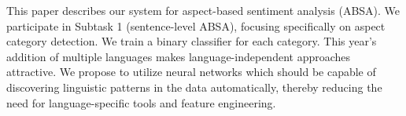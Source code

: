 This paper describes our system for aspect-based sentiment analysis (ABSA). We participate in Subtask 1 (sentence-level ABSA), focusing specifically on aspect category detection. We train a binary classifier for each category. This year's addition of multiple languages makes language-independent approaches attractive. We propose to utilize neural networks which should be capable of discovering linguistic patterns in the data automatically, thereby reducing the need for language-specific tools and feature engineering.
